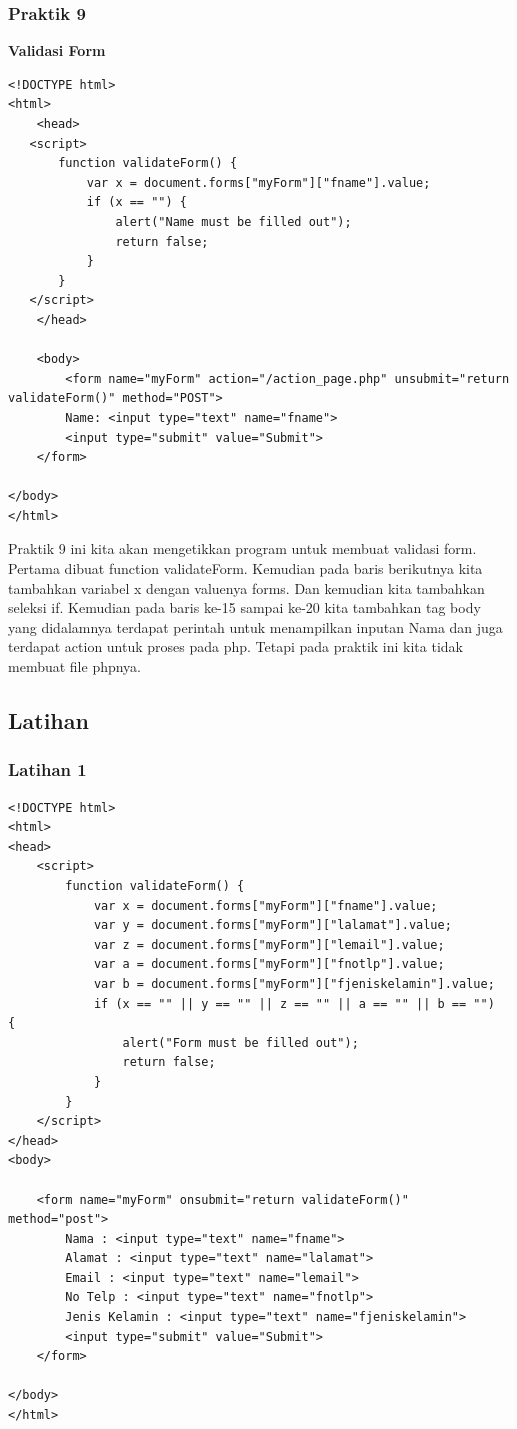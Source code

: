 \documentclass[a4paper,12pt]{article}
\begin{document}
\subsubsection{Praktik 9}
\textbf{Validasi Form}
\begin{lstlisting}
<!DOCTYPE html>
<html>
    <head>
   <script>
       function validateForm() {
           var x = document.forms["myForm"]["fname"].value;
           if (x == "") {
               alert("Name must be filled out");
               return false;
           }
       }
   </script>
    </head>

    <body>
        <form name="myForm" action="/action_page.php" unsubmit="return validateForm()" method="POST">
		Name: <input type="text" name="fname">
		<input type="submit" value="Submit">
	</form>
	
</body>
</html>
\end{lstlisting}
Praktik 9 ini kita akan mengetikkan program untuk membuat validasi form. Pertama dibuat function validateForm. Kemudian
pada baris berikutnya kita tambahkan variabel x dengan valuenya forms. Dan kemudian kita tambahkan seleksi if. Kemudian
pada baris ke-15 sampai ke-20 kita tambahkan tag body
yang didalamnya terdapat perintah untuk menampilkan inputan Nama dan juga terdapat action untuk proses pada php. Tetapi
pada praktik ini kita tidak membuat file phpnya.

\subsection{Latihan}
\subsubsection{Latihan 1}
\begin{lstlisting}
<!DOCTYPE html>
<html>
<head>
	<script>
		function validateForm()	{
			var x = document.forms["myForm"]["fname"].value;
			var y = document.forms["myForm"]["lalamat"].value;
			var z = document.forms["myForm"]["lemail"].value;
			var a = document.forms["myForm"]["fnotlp"].value;
			var b = document.forms["myForm"]["fjeniskelamin"].value;
			if (x == "" || y == "" || z == "" || a == "" || b == "")  {
				alert("Form must be filled out");
				return false;
			}
		}
	</script>
</head>
<body>

	<form name="myForm" onsubmit="return validateForm()" method="post"> 
		Nama : <input type="text" name="fname">
		Alamat : <input type="text" name="lalamat">
		Email : <input type="text" name="lemail">
		No Telp : <input type="text" name="fnotlp">
		Jenis Kelamin : <input type="text" name="fjeniskelamin">
		<input type="submit" value="Submit">
	</form>
	
</body>
</html>
\end{lstlisting}
\end{document}
